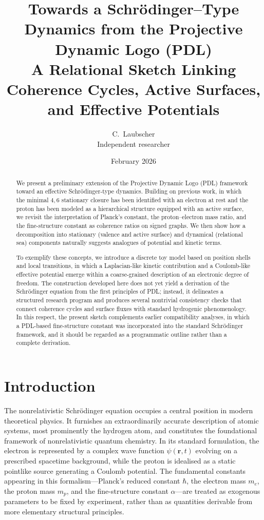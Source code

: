\documentclass[11pt,a4paper]{article}
\title{Towards a Schr\"odinger--Type Dynamics from the Projective Dynamic Logo (PDL)\\
A Relational Sketch Linking Coherence Cycles, Active Surfaces, and Effective Potentials}
\author{C.\ Laubscher\\
{\small Independent researcher}}
\date{February 2026}
\begin{document}
\maketitle

\begin{abstract}
We present a preliminary extension of the Projective Dynamic Logo (PDL) framework toward an effective Schrödinger-type dynamics. Building on previous work, in which the minimal $4,6$ stationary closure has been identified with an electron at rest and the proton has been modeled as a hierarchical structure equipped with an active surface, we revisit the interpretation of Planck’s constant, the proton–electron mass ratio, and the fine-structure constant as coherence ratios on signed graphs. We then show how a decomposition into stationary (valence and active surface) and dynamical (relational sea) components naturally suggests analogues of potential and kinetic terms. 

To exemplify these concepts, we introduce a discrete toy model based on position shells and local transitions, in which a Laplacian-like kinetic contribution and a Coulomb-like effective potential emerge within a coarse-grained description of an electronic degree of freedom. The construction developed here does not yet yield a derivation of the Schrödinger equation from the first principles of PDL; instead, it delineates a structured research program and produces several nontrivial consistency checks that connect coherence cycles and surface fluxes with standard hydrogenic phenomenology. In this respect, the present sketch complements earlier compatibility analyses, in which a PDL-based fine-structure constant was incorporated into the standard Schrödinger framework, and it should be regarded as a programmatic outline rather than a complete derivation.
\end{abstract}

\section{Introduction}

The nonrelativistic Schr\"odinger equation occupies a central position in modern theoretical physics. It furnishes an extraordinarily accurate description of atomic systems, most prominently the hydrogen atom, and constitutes the foundational framework of nonrelativistic quantum chemistry. In its standard formulation, the electron is represented by a complex wave function $\psi(\mathbf{r},t)$ evolving on a prescribed spacetime background, while the proton is idealised as a static pointlike source generating a Coulomb potential. The fundamental constants appearing in this formalism—Planck’s reduced constant $\hbar$, the electron mass $m_e$, the proton mass $m_p$, and the fine-structure constant $\alpha$—are treated as exogenous parameters to be fixed by experiment, rather than as quantities derivable from more elementary structural principles.\par
\end{document}
